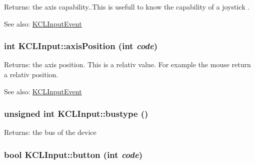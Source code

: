 \begin{Desc}
\item[Returns:]the axis capability..This is usefull to know the capability of a joystick . \end{Desc}
\begin{Desc}
\item[See also:]\hyperlink{class_k_c_l_input_event}{KCLInputEvent} \end{Desc}
\hypertarget{class_k_c_l_input_80bd12aea5ae92a327af1db942ef25b9}{
\subsubsection[{axisPosition}]{\setlength{\rightskip}{0pt plus 5cm}int KCLInput::axisPosition (int {\em code})}}
\label{class_k_c_l_input_80bd12aea5ae92a327af1db942ef25b9}


\begin{Desc}
\item[Returns:]the axis position. This is a relativ value. For example the mouse return a relativ position. \end{Desc}
\begin{Desc}
\item[See also:]\hyperlink{class_k_c_l_input_event}{KCLInputEvent} \end{Desc}
\hypertarget{class_k_c_l_input_5636bb74f7e17ad8b09dcbbc3be2a736}{
\subsubsection[{bustype}]{\setlength{\rightskip}{0pt plus 5cm}unsigned int KCLInput::bustype ()}}
\label{class_k_c_l_input_5636bb74f7e17ad8b09dcbbc3be2a736}


\begin{Desc}
\item[Returns:]the bus of the device \end{Desc}
\hypertarget{class_k_c_l_input_afe120b671d76b4b7d14b48e03d4faf6}{
\subsubsection[{button}]{\setlength{\rightskip}{0pt plus 5cm}bool KCLInput::button (int {\em code})}}
\label{class_k_c_l_input_afe120b671d76b4b7d14b48e03d4faf6}


